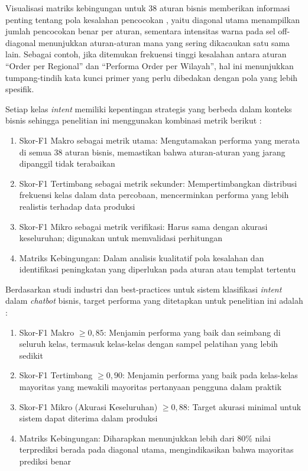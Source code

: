 Visualisasi matriks kebingungan untuk 38 aturan bisnis memberikan informasi penting tentang pola kesalahan pencocokan \autocite{EvidentlyMultiClass}, yaitu diagonal utama menampilkan jumlah pencocokan benar per aturan, sementara intensitas warna pada sel off-diagonal menunjukkan aturan-aturan mana yang sering dikacaukan satu sama lain. Sebagai contoh, jika ditemukan frekuensi tinggi kesalahan antara aturan ``Order per Regional'' dan ``Performa Order per Wilayah'', hal ini menunjukkan tumpang-tindih kata kunci primer yang perlu dibedakan dengan pola yang lebih spesifik.

Setiap kelas \textit{intent} memiliki kepentingan strategis yang berbeda dalam konteks bisnis sehingga penelitian ini menggunakan kombinasi metrik berikut \autocite{Grandini2020MultiClassMetrics}:

\begin{enumerate}[label=\alph*.]
    \item Skor-F1 Makro sebagai metrik utama: Mengutamakan performa yang merata di semua 38 aturan bisnis, memastikan bahwa aturan-aturan yang jarang dipanggil tidak terabaikan
    
    \item Skor-F1 Tertimbang sebagai metrik sekunder: Mempertimbangkan distribusi frekuensi kelas dalam data percobaan, mencerminkan performa yang lebih realistis terhadap data produksi
    
    \item Skor-F1 Mikro sebagai metrik verifikasi: Harus sama dengan akurasi keseluruhan; digunakan untuk memvalidasi perhitungan
    
    \item Matriks Kebingungan: Dalam analisis kualitatif pola kesalahan dan identifikasi peningkatan yang diperlukan pada aturan atau templat tertentu
\end{enumerate}

Berdasarkan studi industri dan best-practices untuk sistem klasifikasi \textit{intent} dalam \textit{chatbot} bisnis, target performa yang ditetapkan untuk penelitian ini adalah \autocite{Santosa2025IndoBERTIntent,Ozerova2022IntentModule}:

\begin{enumerate}[label=\alph*.]
    \item Skor-F1 Makro \(\geq 0{,}85\): Menjamin performa yang baik dan seimbang di seluruh kelas, termasuk kelas-kelas dengan sampel pelatihan yang lebih sedikit
    
    \item Skor-F1 Tertimbang \(\geq 0{,}90\): Menjamin performa yang baik pada kelas-kelas mayoritas yang mewakili mayoritas pertanyaan pengguna dalam praktik
    
    \item Skor-F1 Mikro (Akurasi Keseluruhan) \(\geq 0{,}88\): Target akurasi minimal untuk sistem dapat diterima dalam produksi
    
    \item Matriks Kebingungan: Diharapkan menunjukkan lebih dari 80\% nilai terprediksi berada pada diagonal utama, mengindikasikan bahwa mayoritas prediksi benar
\end{enumerate}

